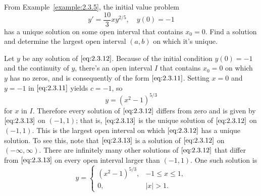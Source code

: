 \documentclass{ximera}
\begin{document}

\begin{example} \label{example:2.3.7}
From Example~\ref{example:2.3.5}, the initial value
problem
\begin{equation} \label{eq:2.3.12}
y'=\frac{10}{3}xy^{2/5}, \quad y(0)=-1
\end{equation}
 has a  unique solution on some open interval that contains $x_0=0$.
Find a solution and determine the largest open interval $(a,b)$ on
which it's unique.

\begin{explanation}
Let $y$ be any solution of $\eqref{eq:2.3.12}$. Because of the initial
condition $y(0)=-1$ and the continuity of $y$, there's an open interval
$I$ that contains $x_0=0$ on which $y$ has no zeros, and is consequently
of the form $\eqref{eq:2.3.11}$. Setting $x=0$ and $y=-1$ in $\eqref{eq:2.3.11}$
yields $c=-1$, so
\begin{equation} \label{eq:2.3.13}
y=(x^2-1)^{5/3}
\end{equation}
for $x$  in $I$.
Therefore every solution of $\eqref{eq:2.3.12}$ differs from zero
and is given by $\eqref{eq:2.3.13}$ on $(-1,1)$; that is,
$\eqref{eq:2.3.13}$ is the unique solution of $\eqref{eq:2.3.12}$ on
$(-1,1)$.
 This is the largest open interval on which
$\eqref{eq:2.3.12}$ has a unique solution. To see this, note that
$\eqref{eq:2.3.13}$ is a solution of $\eqref{eq:2.3.12}$ on $(-\infty,\infty)$.
There are infinitely many other solutions
of $\eqref{eq:2.3.12}$ that differ from $\eqref{eq:2.3.13}$ on every open interval
larger than
$(-1,1)$. One such solution is
$$
y = \left\{ \begin{array}{cl}
(x^2-1)^{5/3}, & -1 \le x \le 1, \\[6pt]
0,             & |x|>1. \end{array} \right.
$$

\begin{center}
\end{center}




\end{explanation}
\end{example}
\end{document}
